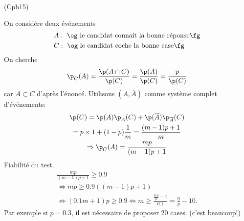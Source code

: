 \begin{tiny}(Cpb15)\end{tiny} On considère deux événements
\[
  \begin{aligned}
    &A: \text{ \og le candidat connait la bonne réponse\fg}\\
    &C: \text{ \og le candidat coche la bonne case\fg}
  \end{aligned}
\]
On cherche
\[
  \p_C(A) = \frac{\p(A\cap C)}{\p(C)}
  =\frac{\p(A)}{\p(C)}
  = \frac{p}{\p(C)}
\]
car $A \subset C$ d'après l'énoncé. Utilisons $(A, \overline{A})$ comme système complet d'événements:
\begin{multline*}
  \p(C) = \p(A)\p_A(C) + \p(\overline{A})\p_{\overline{A}}(C)\\
  = p \times 1 + (1 - p)\frac{1}{m}
  = \frac{(m-1)p+1}{m} \\
\Rightarrow 
\p_C(A) = \frac{mp}{(m-1)p+1}
\end{multline*}
Fiabilité du test.
\begin{multline*}
  \frac{mp}{(m-1)p+1} \geq 0.9 \\
  \Leftrightarrow
  m p\geq 0.9((m-1)p + 1)\\
  \Leftrightarrow
  (0.1 m +1)p \geq 0.9
  \Leftrightarrow
  m \geq \frac{\frac{0.9}{p} -1}{0.1}
  = \frac{9}{p} -10.
\end{multline*}
Par exemple si $p=0.3$, il est nécessaire de proposer 20 cases. (c'est beaucoup!)
